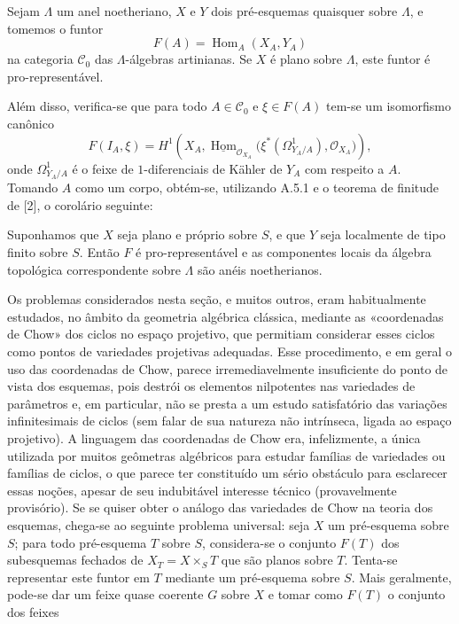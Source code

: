  Sejam $\Lambda$ um anel noetheriano, $X$ e $Y$ dois
pré-esquemas quaisquer sobre $\Lambda$, e tomemos o funtor
\[
  F(A)=\operatorname{Hom}_A(X_A,Y_A)
\]
na categoria $\mathcal C_0$ das $\Lambda$-álgebras artinianas. Se $X$ é
plano sobre $\Lambda$, este funtor é pro-representável.

Além disso, verifica-se que para todo $A\in\mathcal C_0$ e $\xi\in F(A)$ tem-se
um isomorfismo canônico
\[
  F(I_A,\xi)=H^1\!\left(
    X_A,
    \underline{\operatorname{Hom}}_{\mathcal O_{X_A}}
    \bigl(\xi^*(\Omega^1_{Y_A/A}),\mathcal O_{X_A}\bigr)
  \right),
\]
onde $\Omega^1_{Y_A/A}$ é o feixe de $1$-diferenciais de Kähler de $Y_A$
com respeito a $A$. Tomando $A$ como um corpo, obtém-se, utilizando A.5.1 e o
teorema de finitude de [2], o corolário seguinte:

 Suponhamos que $X$ seja plano e próprio sobre $S$, e que $Y$
seja localmente de tipo finito sobre $S$. Então $F$ é pro-representável e as
componentes locais da álgebra topológica correspondente sobre $\Lambda$ são
anéis noetherianos.

 Os problemas considerados nesta seção, e muitos
outros, eram habitualmente estudados, no âmbito da geometria algébrica
clássica, mediante as «coordenadas de Chow» dos ciclos no espaço
projetivo, que permitiam considerar esses ciclos como pontos de variedades
projetivas adequadas. Esse procedimento, e em geral o uso das
coordenadas de Chow, parece irremediavelmente insuficiente do ponto de
vista dos esquemas, pois destrói os elementos nilpotentes nas
variedades de parâmetros e, em particular, não se presta a um estudo
satisfatório das variações infinitesimais de ciclos (sem falar de sua
natureza não intrínseca, ligada ao espaço projetivo). A linguagem das
coordenadas de Chow era, infelizmente, a única utilizada por muitos
geômetras algébricos para estudar famílias de variedades ou famílias de
ciclos, o que parece ter constituído um sério obstáculo para esclarecer essas
noções, apesar de seu indubitável interesse técnico (provavelmente provisório). Se
se quiser obter o análogo das variedades de Chow na teoria dos
esquemas, chega-se ao seguinte problema universal: seja $X$ um pré-esquema sobre
$S$; para todo pré-esquema $T$ sobre $S$, considera-se o conjunto $F(T)$ dos
subesquemas fechados de $X_T=X\times_ST$ que são planos sobre $T$. Tenta-se
representar este funtor em $T$ mediante um pré-esquema sobre $S$. Mais
geralmente, pode-se dar um feixe quase coerente $G$ sobre $X$ e tomar como
$F(T)$ o conjunto dos feixes


